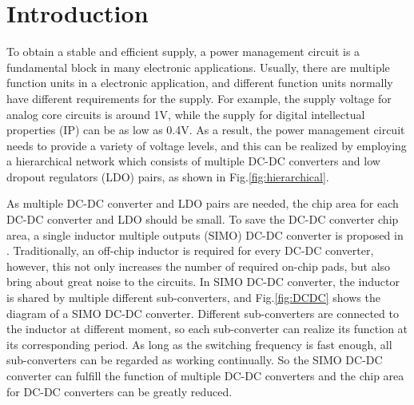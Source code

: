\documentclass[journal]{IEEEtran}
\begin{document}
\section{Introduction}
To obtain a stable and efficient supply, a power management circuit is a fundamental block in many electronic applications\cite{original,coarse-fine,AALDO,AALDO1,NANDbasedAAloop,pipeline,asynchrounous,recursive,AP}. Usually, there are multiple function units in a electronic application, and different function units normally have different requirements for the supply. For example, the supply voltage for analog core circuits is around 1V, while the supply for digital intellectual properties (IP) can be as low as 0.4V. As a result, the power management circuit needs to provide a variety of voltage levels, and this can be realized by employing a hierarchical network which consists of multiple DC-DC converters and low dropout regulators (LDO) pairs, as shown in Fig.\ref{fig:hierarchical}. 

As multiple DC-DC converter and LDO pairs are needed, the chip area for each DC-DC converter and LDO should be small. To save the DC-DC converter chip area, a single inductor multiple outputs (SIMO) DC-DC converter is proposed in \cite{SIMODCDC,SIMODCDC1,SIMODCDC2}. Traditionally, an off-chip inductor is required for every DC-DC converter, however, this not only increases the number of required on-chip pads, but also bring about great noise to the circuits. In SIMO DC-DC converter, the inductor is shared by multiple different sub-converters, and Fig.\ref{fig:DCDC} shows the diagram of a SIMO DC-DC converter. Different sub-converters are connected to the inductor at different moment, so each sub-converter can realize its function at its corresponding period. As long as the switching frequency is fast enough, all sub-converters can be regarded as working continually. So the SIMO DC-DC converter can fulfill the function of multiple DC-DC converters and the chip area for DC-DC converters can be greatly reduced.
\end{document}

